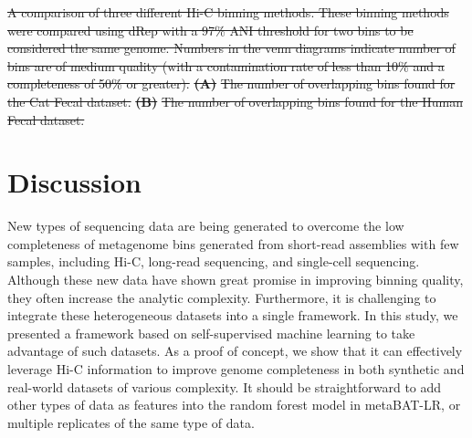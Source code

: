\documentclass[fleqn,10pt,lineno]{wlpeerj}
\providecommand{\DIFdeltex}[1]{{\protect\color{red}\sout{#1}}}                      %
\providecommand{\DIFaddend}{} %
\providecommand{\DIFdelbegin}{} %
\providecommand{\DIFdelend}{} %
\providecommand{\DIFdelFL}[1]{\DIFdel{#1}} %
\providecommand{\DIFdel}[1]{\texorpdfstring{\DIFdeltex{#1}}{}} %
\newcommand{\DIFscaledelfig}{0.5}
\newlength{\DIFdelgraphicswidth} %
\newlength{\DIFdelgraphicsheight} %
\newcommand{\DIFdelincludegraphics}[2][]{%
\sbox{\DIFdelgraphicsbox}{\DIFOincludegraphics[#1]{#2}}%
\settoboxwidth{\DIFdelgraphicswidth}{\DIFdelgraphicsbox} %
\settoboxtotalheight{\DIFdelgraphicsheight}{\DIFdelgraphicsbox} %
\scalebox{\DIFscaledelfig}{%
\parbox[b]{\DIFdelgraphicswidth}{\usebox{\DIFdelgraphicsbox}\\[-\baselineskip] \rule{\DIFdelgraphicswidth}{0em}}\llap{\resizebox{\DIFdelgraphicswidth}{\DIFdelgraphicsheight}{%
\setlength{\unitlength}{\DIFdelgraphicswidth}%
\begin{picture}(1,1)%
\thicklines\linethickness{2pt} %
{\color[rgb]{1,0,0}\put(0,0){\framebox(1,1){}}}%
{\color[rgb]{1,0,0}\put(0,0){\line( 1,1){1}}}%
{\color[rgb]{1,0,0}\put(0,1){\line(1,-1){1}}}%
\end{picture}%
}\hspace*{3pt}}} %
} %
\DeclareRobustCommand{\DIFaddend}{\DIFOaddend \let\includegraphics\DIFOincludegraphics} %
\DeclareRobustCommand{\DIFdelbegin}{\DIFOdelbegin \let\includegraphics\DIFdelincludegraphics} %
\DeclareRobustCommand{\DIFdelend}{\DIFOaddend \let\includegraphics\DIFOincludegraphics} %
\begin{document}
\DIFaddend 


\DIFdelbegin %
{%
\DIFdelFL{A comparison of three different Hi-C binning methods. These binning methods were compared using dRep with a 97\% ANI threshold for two bins to be considered the same genome. Numbers in the venn diagrams indicate number of bins are of medium quality (with a contamination rate of less than 10\% and a completeness of 50\% or greater). }\textbf{\DIFdelFL{(A)}} %
\DIFdelFL{The number of overlapping bins found for the Cat Fecal dataset. }\textbf{\DIFdelFL{(B)}} %
\DIFdelFL{The number of overlapping bins found for the Human Fecal dataset.}}

\DIFdelend \section*{Discussion}

New types of sequencing data are being generated to overcome the low completeness of metagenome bins generated from short-read assemblies with few samples, including Hi-C, long-read sequencing, and single-cell sequencing. Although these new data have shown great promise in improving binning quality, they often increase the analytic complexity. Furthermore, it is challenging to integrate these heterogeneous datasets into a single framework. In this study, we presented a framework based on self-supervised machine learning to take advantage of such datasets. As a proof of concept, we show that it can effectively leverage Hi-C information to improve genome completeness in both synthetic and real-world datasets of various complexity. It should be straightforward to add other types of data as features into the random forest model in metaBAT-LR, or multiple replicates of the same type of data. 
\end{document}
